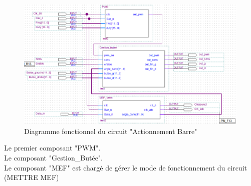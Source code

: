   \begin{figure}[h]
    \begin{center}
      \includegraphics[width=\textwidth]{images/verin.png}
      \caption{Diagramme fonctionnel du circuit "Actionnement Barre"}
    \end{center}
  \end{figure}

  Le premier composant "PWM".\\\newline
  Le composant "Gestion\_Butée".\\\newline
  Le composant "MEF" est chargé de gérer le mode de fonctionnement du circuit (METTRE MEF)